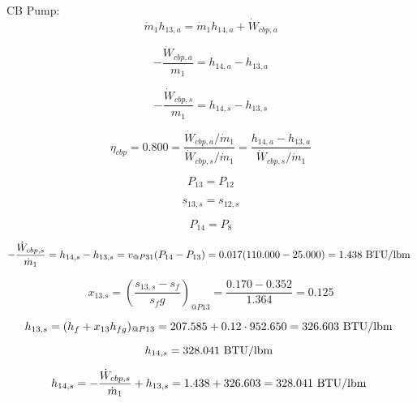 \documentclass{article}
\begin{document}
CB Pump:
\begin{equation}
\dot{m}_{ 1}h_{13,a} = \dot{m}_{ 1}h_{14,a} + \dot{W}_{cbp,a}
\end{equation}

\begin{equation}
-\frac{\dot{W}_{cbp,a}}{m_1} = h_{14,a} - h_{13,a}\end{equation}

\begin{equation}
-\frac{\dot{W}_{cbp,s}}{m_1} = h_{14,s} - h_{13,s}\end{equation}

\begin{equation}
\eta_{cbp} =    0.800 = \frac{\dot{W}_{cbp,a} / \dot{m}_{1}}{\dot{W}_{cbp,s} / \dot{m}_{1}} = \frac{
h_{14,a} - h_{13,a}}{\dot{W}_{cbp,s} / \dot{m}_{1}}
\end{equation}

\begin{equation}
P_{13} = P_{12}
\end{equation}

\begin{equation}
s_{13,s} = s_{12,s}
\end{equation}

\begin{equation}
P_{14} = P_{ 8}
\end{equation}

\begin{equation}
-\frac{\dot{W}_{cbp,s}}{\dot{m}_{ 1}} = h_{14,s} - h_{13,s} = v_{@P31}(P_{14} - P_{13}) =    0.017( 110.000 -   25.000) =    1.438\textnormal{ BTU/lbm                   }
\end{equation}

\begin{equation}
x_{13.s} = (\frac{s_{13,s} - s_{f}}{s_fg})_{@P13} = \frac{   0.170 -    0.352}{   1.364} =    0.125
\end{equation}

\begin{equation}
  h_{13,s} = (h_{f} + x_{13}h_{fg})_{@P13} =  207.585 + 0.12\cdot 952.650 =  326.603
\textnormal{ BTU/lbm                   }
\end{equation}

\begin{equation}
  h_{14,s} =  328.041\textnormal{ BTU/lbm                   }
\end{equation}

\begin{equation}
h_{14,s} = -\frac{\dot{W}_{cbp,s}}{\dot{m}_{1}} + h_{13,s} =    1.438 +  326.603 =  328.041\textnormal{ BTU/lbm                   }
\end{equation}
\end{document}
